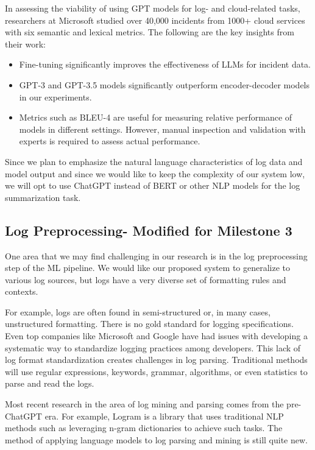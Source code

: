 \documentclass[conference]{IEEEtran}
\begin{document}
In assessing the viability of using GPT models for log- and cloud-related tasks, researchers at Microsoft studied over 40,000 incidents from 1000+ cloud services with six semantic and lexical metrics.\cite{10172904}  The following are the key insights from their work:
\begin{itemize}
    \item Fine-tuning significantly improves the effectiveness of LLMs for incident data.
    \item GPT-3 and GPT-3.5 models significantly outperform encoder-decoder models in our experiments.
    \item Metrics such as BLEU-4 are useful for measuring relative performance of models in different settings. However, manual inspection and validation with experts is required to assess actual performance.
\end{itemize}

Since we plan to emphasize the natural language characteristics of log data and model output and since we would like to keep the complexity of our system low, we will opt to use ChatGPT instead of BERT or other NLP models for the log summarization task. 

\subsection{Log Preprocessing- Modified for Milestone 3}

One area that we may find challenging in our research is in the log preprocessing step of the ML pipeline. We would like our proposed system to generalize to various log sources, but logs have a very diverse set of formatting rules and contexts. 

For example, logs are often found in semi-structured or, in many cases, unstructured formatting. There is no gold standard for logging specifications. Even top companies like Microsoft and Google have had issues with developing a systematic way to standardize logging practices among developers. This lack of log format standardization creates challenges in log parsing. Traditional methods will use regular expressions, keywords, grammar, algorithms, or even statistics to parse and read the logs. \cite{survey-log-aiops}

Most recent research in the area of log mining and parsing comes from the pre-ChatGPT era. For example, Logram is a library that uses traditional NLP methods such as leveraging n-gram dictionaries to achieve such tasks. \cite{10189040} The method of applying language models to log parsing and mining is still quite new. 
\end{document}
